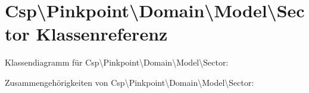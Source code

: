 \hypertarget{classCsp_1_1Pinkpoint_1_1Domain_1_1Model_1_1Sector}{}\section{Csp\textbackslash{}Pinkpoint\textbackslash{}Domain\textbackslash{}Model\textbackslash{}Sector Klassenreferenz}
\label{classCsp_1_1Pinkpoint_1_1Domain_1_1Model_1_1Sector}


Klassendiagramm für Csp\textbackslash{}Pinkpoint\textbackslash{}Domain\textbackslash{}Model\textbackslash{}Sector\+:


Zusammengehörigkeiten von Csp\textbackslash{}Pinkpoint\textbackslash{}Domain\textbackslash{}Model\textbackslash{}Sector\+:
